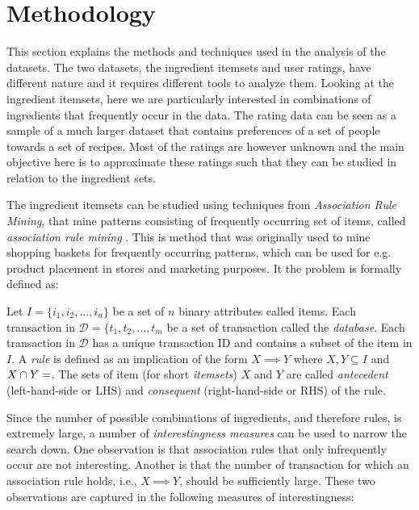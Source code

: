 

\section{Methodology}
\label{sec:methodology}

This section explains the methods and techniques used in the analysis of the datasets.
The two datasets, the ingredient itemsets and user ratings, have different nature and it requires different tools to analyze them.
Looking at the ingredient itemsets, here we are particularly interested in combinations of ingredients that frequently occur in the data.
The rating data can be seen as a sample of a much larger dataset that contains preferences of a set of people towards a set of recipes.
Most of the ratings are however unknown and the main objective here is to approximate these ratings such that they can be studied in relation to the ingredient sets.




The ingredient itemsets can be studied using techniques from \emph{Association Rule Mining}, that mine patterns consisting of frequently occurring set of items, called \emph{association rule mining} \citep{Agrawal1993}.
This is method that was originally used to mine shopping baskets for frequently occurring patterns, which can be used for e.g. product placement in stores and marketing purposes.
It the problem is formally defined as:

\begin{definition}
	Let $I = \{i_1, i_2, \dots, i_n\}$ be a set of $n$ binary attributes called items. Each transaction in $\mathcal{D}=\{t_1, t_2, \dots, t_m$ be a set of transaction called the \emph{database}. Each transaction in $\mathcal{D}$ has a unique transaction ID and contains a subset of the item in $I$. A \emph{rule} is defined as an implication of the form $X \implies Y$ where $X,Y \subseteq I$ and $X \cap Y=\empty$. The sets of item (for short \emph{itemsets}) $X$ and $Y$ are called \emph{antecedent} (left-hand-side or LHS) and \emph{consequent} (right-hand-side or RHS) of the rule.
\end{definition}

Since the number of possible combinations of ingredients, and therefore rules, is extremely large, a number of \emph{interestingness measures} can be used to narrow the search down.
One observation is that association rules that only infrequently occur are not interesting.
Another is that the number of transaction for which an association rule holds, i.e., $X \implies Y$, should be sufficiently large.
These two observations are captured in the following measures of interestingness:

